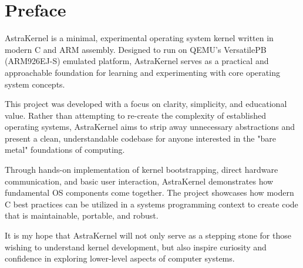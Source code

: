 \doublespacing
\newpage
{}
\section*{Preface}

AstraKernel is a minimal, experimental operating system kernel written in modern 
C and ARM assembly. Designed to run on QEMU’s VersatilePB (ARM926EJ-S) emulated 
platform, AstraKernel serves as a practical and approachable foundation for 
learning and experimenting with core operating system concepts.

This project was developed with a focus on clarity, simplicity, and educational 
value. Rather than attempting to re-create the complexity of established operating 
systems, AstraKernel aims to strip away unnecessary abstractions and present a 
clean, understandable codebase for anyone interested in the "bare metal" 
foundations of computing.

Through hands-on implementation of kernel bootstrapping, direct hardware 
communication, and basic user interaction, AstraKernel demonstrates how 
fundamental OS components come together. The project showcases how modern C 
best practices can be utilized in a systems programming context to create 
code that is maintainable, portable, and robust.

It is my hope that AstraKernel will not only serve as a stepping stone 
for those wishing to understand kernel development, but also inspire curiosity 
and confidence in exploring lower-level aspects of computer systems.

